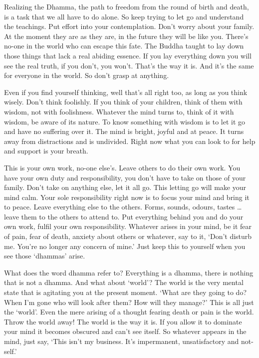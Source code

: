 Realizing the Dhamma, the path to freedom from the round of birth and death, is a task that we all have to do alone. So keep trying to let go and understand the teachings. Put effort into your contemplation. Don't worry about your family. At the moment they are as they are, in the future they will be like you. There's no-one in the world who can escape this fate. The Buddha taught to lay down those things that lack a real abiding essence. If you lay everything down you will see the real truth, if you don't, you won't. That's the way it is. And it's the same for everyone in the world. So don't grasp at anything.

Even if you find yourself thinking, well that's all right too, as long as you think wisely. Don't think foolishly. If you think of your children, think of them with wisdom, not with foolishness. Whatever the mind turns to, think of it with wisdom, be aware of its nature. To know something with wisdom is to let it go and have no suffering over it. The mind is bright, joyful and at peace. It turns away from distractions and is undivided. Right now what you can look to for help and support is your breath.

This is your own work, no-one else's. Leave others to do their own work. You have your own duty and responsibility, you don't have to take on those of your family. Don't take on anything else, let it all go. This letting go will make your mind calm. Your sole responsibility right now is to focus your mind and bring it to peace. Leave everything else to the others. Forms, sounds, odours, tastes \ldots{} leave them to the others to attend to. Put everything behind you and do your own work, fulfil your own responsibility. Whatever arises in your mind, be it fear of pain, fear of death, anxiety about others or whatever, say to it, `Don't disturb me. You're no longer any concern of mine.' Just keep this to yourself when you see those `dhammas' arise.

What does the word dhamma refer to? Everything is a dhamma, there is nothing that is not a dhamma. And what about `world'? The world is the very mental state that is agitating you at the present moment. `What are they going to do? When I'm gone who will look after them? How will they manage?' This is all just the `world'. Even the mere arising of a thought fearing death or pain is the world. Throw the world away! The world is the way it is. If you allow it to dominate your mind it becomes obscured and can't see itself. So whatever appears in the mind, just say, `This isn't my business. It's impermanent, unsatisfactory and not-self.'


